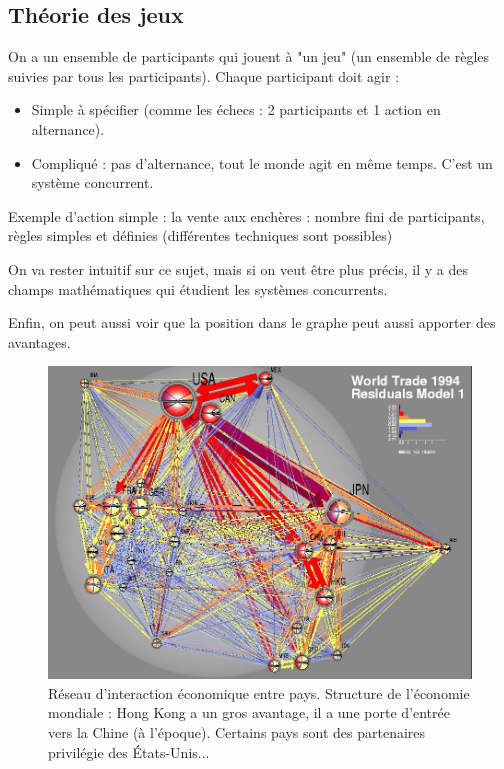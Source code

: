 \subsection{Théorie des jeux}
On a un ensemble de participants qui jouent à "un jeu" (un ensemble de règles suivies par tous les participants). Chaque participant doit agir : 

\begin{itemize}
\item Simple à spécifier (comme les échecs : 2 participants et 1 action en alternance). 
\item Compliqué : pas d'alternance, tout le monde agit en même temps. C'est un système concurrent.
\end{itemize}

Exemple d'action simple : la vente aux enchères : 
	nombre fini de participants,
	règles simples et définies (différentes techniques sont possibles)
	
\vspace{1cm}

On va rester intuitif sur ce sujet, mais si on veut être plus précis, il y a des champs mathématiques qui étudient les systèmes concurrents.

Enfin, on peut aussi voir que la position dans le graphe peut aussi apporter des avantages.

\begin{figure}[!ht]
\centering
\includegraphics[width=0.8\linewidth]{images/network_international_trade.png}
\caption{Réseau d'interaction économique entre pays. Structure de
    l'économie mondiale : Hong Kong a un gros avantage, il a une porte
    d'entrée vers la Chine (à l'époque). Certains pays sont des
partenaires privilégie des États-Unis...}
\end{figure}


